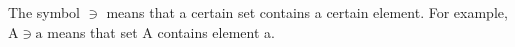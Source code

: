 The symbol $ \ni $ means that a certain set contains a certain element.
For example, $ \mathrm{A} \ni \mathrm{a} $ means that set A contains element
a.